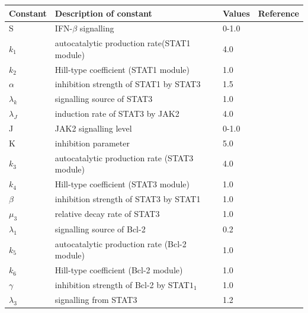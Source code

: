 
 \begin{table}[hbt!]
\begin{center}
    \begin{tabular}{p{2.5cm}|p{9cm}|p{1.2cm}|p{2cm}}
    \hline
  \textbf{Constant} &  \textbf{Description of constant} &\textbf{Values} &\textbf{Reference}
    \\
    \hline \hline
    S & IFN-$\beta$ signalling  & 0-1.0& \cite{lee2021mathematical,deng2014sting}\\
$k_1$ & autocatalytic production rate(STAT1 module) & 4.0 & \cite{lee2021mathematical}\\
$ k_2$ & Hill-type coefficient (STAT1 module) & 1.0  & \cite{lee2021mathematical}\\
   $\alpha$ & inhibition strength of STAT1 by STAT3 & 1.5 & \cite{lee2021mathematical}\\
   $\lambda_k $& signalling source of STAT3 & 1.0 & \cite{lee2021mathematical}\\
   $ \lambda_J$ & induction rate of STAT3 by JAK2 & 4.0 & \cite{lee2021mathematical}\\
      J & JAK2 signalling level & 0-1.0 & \cite{lee2021mathematical}\\
K & inhibition parameter & 5.0 & \cite{lee2021mathematical}\\
$k_3$ & autocatalytic production rate (STAT3 module) & 4.0 & \cite{lee2021mathematical}\\
$k_4$ & Hill-type coefficient (STAT3 module) & 1.0 & \cite{lee2021mathematical}\\
$\beta$ & inhibition strength of STAT3 by STAT1& 1.0 & \cite{lee2021mathematical}\\
$\mu_3$ & relative decay rate of STAT3 & 1.0 & \cite{andrejeva2002degradation, yang2017porcine}\\
$\lambda_1$ & signalling source of Bcl-2 & 0.2 & \cite{lee2021mathematical}\\
$k_5$ & autocatalytic production rate (Bcl-2 module) & 1.0 & \cite{lee2021mathematical}\\
$k_6$ & Hill-type coefficient (Bcl-2 module) & 1.0 & \cite{lee2021mathematical}\\
$\gamma $ & inhibition strength of Bcl-2 by STAT$1_1$ & 1.0 & \cite{lee2021mathematical}\\
$\lambda_3$ & signalling from STAT3 & 1.2 & \cite{lee2021mathematical}\\

\end{tabular}
\end{center}
\end{table}
